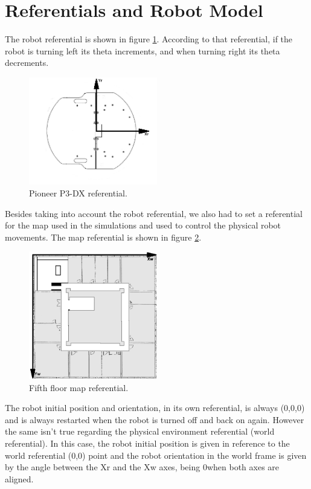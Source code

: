 \documentclass[11pt,a4paper]{scrartcl}
\begin{document}
\section{Referentials and Robot Model}
The robot referential is shown in figure \ref{fig:Robot_Referential}. According to that referential, if the robot is turning left its theta increments, and when turning right its theta decrements.
	\begin{figure}[H]
		\centerline{\includegraphics[width=0.5\textwidth]{pioneer_referential.png}}
    	\caption{Pioneer P3-DX referential.}
        \label{fig:Robot_Referential}
	\end{figure}

Besides taking into account the robot referential, we also had to set a referential for the map used in the simulations and used to control the physical robot movements. The map referential is shown in figure \ref{fig:Map_Referential}.

	\begin{figure}[H]
    	\centerline{\includegraphics[width=0.5\textwidth]{map_referential.png}}
        \caption{Fifth floor map referential.}
		\label{fig:Map_Referential}
	\end{figure}

The robot initial position and orientation, in its own referential, is always (0,0,0\degree) and is always restarted when the robot is turned off and back on again. However the same isn't true regarding the physical environment referential (world referential). In this case, the robot initial position is given in reference to the world referential (0,0) point and the robot orientation in the world frame is given by the angle between the Xr and the Xw axes, being 0\degree  when both axes are aligned.
\end{document}
